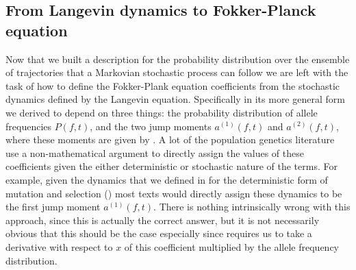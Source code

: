 \subsection{From Langevin dynamics to Fokker-Planck equation}

Now that we built a description for the probability distribution over the
ensemble of trajectories that a Markovian stochastic process can follow we are
left with the task of how to define the Fokker-Plank equation coefficients from
the stochastic dynamics defined by the Langevin equation. Specifically in its
more general form we derived  to depend on three things:
the probability distribution of allele frequencies $P(f, t)$, and the two jump
moments $a^{(1)}(f, t)$ and $a^{(2)}(f, t)$, where these moments are given by
. A lot of the population genetics literature use a
non-mathematical argument to directly assign the values of these coefficients
given the either deterministic or stochastic nature of the terms. For example,
given the dynamics that we defined in  for the
deterministic form of mutation and selection () most texts
would directly assign these dynamics to be the first jump moment
$a^{(1)}(f,t)$. There is nothing intrinsically wrong with this approach, since
this is actually the correct answer, but it is not necessarily obvious that
this should be the case especially since  requires us to
take a derivative with respect to $x$ of this coefficient multiplied by the
allele frequency distribution.

